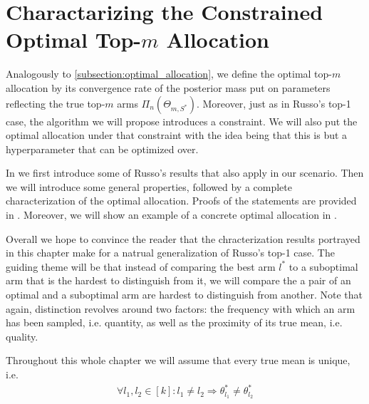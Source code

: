 \chapter{Charactarizing the Constrained Optimal Top-$m$ Allocation}

Analogously to \ref{subsection:optimal_allocation}, we define the optimal top-$m$ allocation by its convergence rate of the posterior mass put on parameters reflecting the true top-$m$ arms $\Pi_n(\Theta_{m, S^*})$. Moreover, just as in Russo's top-1 case, the algorithm we will propose introduces a constraint. We will also put the optimal allocation under that constraint with the idea being that this is but a hyperparameter that can be optimized over.

In  we first introduce some of Russo's results that also apply in our scenario. Then we will introduce some general properties, followed by a complete characterization of the optimal allocation. Proofs of the statements are provided in . Moreover, we will show an example of a concrete optimal allocation in .

Overall we hope to convince the reader that the chracterization results portrayed in this chapter make for a natrual generalization of Russo's top-1 case. The guiding theme will be that instead of comparing the best arm $l^*$ to a suboptimal arm that is the hardest to distinguish from it, we will compare the a pair of an optimal and a suboptimal arm are hardest to distinguish from another. Note that again, distinction revolves around two factors: the frequency with which an arm has been sampled, i.e. quantity, as well as the proximity of its true mean, i.e. quality.

Throughout this whole chapter we will assume that every true mean is unique, i.e.
\begin{align}
  \forall l_1, l_2 \in [k]: l_1 \neq l_2 \Rightarrow \theta^*_{l_1} \neq \theta^*_{l_2}
\end{align}



